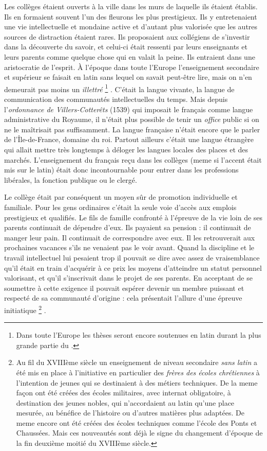 Les collèges étaient ouverts à la ville dans les murs de laquelle ils étaient établis. Ils en formaient souvent l'un des fleurons les plus prestigieux. Ils y entretenaient une vie intellectuelle et mondaine active et d'autant plus valorisée que les autres sources de distraction étaient rares. Ils proposaient aux collégiens de s'investir dans la découverte du savoir, et celui-ci était ressenti par leurs enseignants et leurs parents comme quelque chose qui en valait la peine. Ils entraient dans une aristocratie de l'esprit. À l'époque dans toute l'Europe l'enseignement secondaire et supérieur se faisait en latin sans lequel on savait peut-être lire, mais on n'en demeurait pas moins un \emph{illettré}%
\footnote{Dans toute l'Europe les thèses seront encore soutenues en latin durant la plus grande partie du .}%
. C'était la langue vivante, la langue de communication des communautés intellectuelles du temps. Mais depuis l'\emph{ordonnance de Villers-Cotterêts} (1539) qui imposait le français comme langue administrative du Royaume, il n'était plus possible de tenir un \emph{office} public si on ne le maîtrisait pas suffisamment. La langue française n'était encore que le parler de l'Île-de-France, domaine du roi. Partout ailleurs c'était une langue étrangère qui allait mettre très longtemps à déloger les langues locales des places et des marchés. L'enseignement du français reçu dans les collèges (meme si l'accent était mis sur le latin) était donc incontournable pour entrer dans les professions libérales, la fonction publique ou le clergé. 

 Le collège était par conséquent un moyen sûr de promotion individuelle et familiale. Pour les gens ordinaires c'était la seule voie d'accès aux emplois prestigieux et qualifiés. Le fils de famille confronté à l'épreuve de la vie loin de ses parents continuait de dépendre d'eux. Ils payaient sa pension : il continuait de manger leur pain. Il continuait de correspondre avec eux. Il les retrouverait aux prochaines vacances s'ils ne venaient pas le voir avant. Quand la discipline et le travail intellectuel lui pesaient trop il pouvait se dire avec assez de vraisemblance qu'il était en train d'acquérir à ce prix les moyens d'atteindre un statut personnel valorisant, et qu'il s'inscrivait dans le projet de ses parents. En acceptant de se soumettre à cette exigence il pouvait espérer devenir un membre puissant et respecté de sa communauté d'origine : cela présentait l'allure d'une épreuve initiatique \footnote{Au fil du XVIIIème siècle un enseignement de niveau secondaire \emph{sans latin} a été mis en place à l'initiative en particulier des \emph{frères des écoles chrétiennes} à l'intention de jeunes qui se destinaient à des métiers techniques. De la meme façon ont été créées des écoles militaires, avec internat obligatoire, à destination des jeunes nobles, qui n'accordaient au latin qu'une place mesurée, au bénéfice de l'histoire ou d'autres matières plus adaptées. De meme encore ont été créées des écoles techniques comme l'école des Ponts et Chaussées. Mais ces nouveautés sont déjà le signe du changement d'époque de la fin deuxième moitié du XVIIIème siècle.} .

